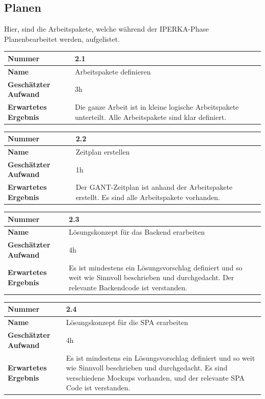 \subsection{Planen}
Hier, sind die Arbeitspakete, welche während der IPERKA-Phase \flqq Planen\frqq{}\space bearbeitet werden, aufgelistet.

\begin{longtable}{p{}|p{}}
	\hline
	\textbf{Nummer}    				& 2.1 \\
	\hline
	\textbf{Name}   				& Arbeitspakete definieren \\
	\hline
	\textbf{Geschätzter Aufwand}	& 3h \\
	\hline
	\textbf{Erwartetes Ergebnis}	& Die ganze Arbeit ist in kleine logische Arbeitspakete unterteilt. Alle Arbeitspakete sind klar definiert.\\
	\hline
\end{longtable}

\begin{longtable}{p{}|p{}}
	\hline
	\textbf{Nummer}    				& 2.2 \\
	\hline
	\textbf{Name}   				& Zeitplan erstellen \\
	\hline
	\textbf{Geschätzter Aufwand}	& 1h \\
	\hline
	\textbf{Erwartetes Ergebnis}	& Der GANT-Zeitplan ist anhand der Arbeitspakete erstellt. Es sind alle Arbeitspakete vorhanden.\\
	\hline
\end{longtable}

\begin{longtable}{p{}|p{}}
	\hline
	\textbf{Nummer}    				& 2.3 \\
	\hline
	\textbf{Name}   				& Lösungskonzept für das Backend erarbeiten\\
	\hline
	\textbf{Geschätzter Aufwand}	& 4h \\
	\hline
	\textbf{Erwartetes Ergebnis}	& Es ist mindestens ein Lösungsvorschlag definiert und so weit wie Sinnvoll beschrieben und durchgedacht. Der relevante Backendcode ist verstanden.\\
	\hline
\end{longtable}\pagebreak

\begin{longtable}{p{}|p{}}
	\hline
	\textbf{Nummer}    				& 2.4 \\
	\hline
	\textbf{Name}   				& Lösungskonzept für die SPA erarbeiten\\
	\hline
	\textbf{Geschätzter Aufwand}	& 4h \\
	\hline
	\textbf{Erwartetes Ergebnis}	& Es ist mindestens ein Lösungsvorschlag definiert und so weit wie Sinnvoll beschrieben und durchgedacht. Es sind verschiedene Mockups vorhanden, und der relevante SPA Code ist verstanden.\\
	\hline
\end{longtable}

